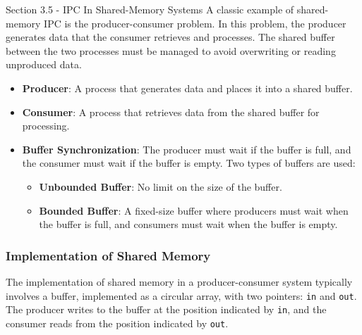 \begin{notes}{Section 3.5 - IPC In Shared-Memory Systems}
    A classic example of shared-memory IPC is the producer-consumer problem. In this problem, the producer generates data that the consumer retrieves and processes. The shared buffer between the two 
    processes must be managed to avoid overwriting or reading unproduced data.
    
    \begin{highlight}
    
        \begin{itemize}
            \item \textbf{Producer}: A process that generates data and places it into a shared buffer.
            \item \textbf{Consumer}: A process that retrieves data from the shared buffer for processing.
            \item \textbf{Buffer Synchronization}: The producer must wait if the buffer is full, and the consumer must wait if the buffer is empty. Two types of buffers are used:
                \begin{itemize}
                    \item \textbf{Unbounded Buffer}: No limit on the size of the buffer.
                    \item \textbf{Bounded Buffer}: A fixed-size buffer where producers must wait when the buffer is full, and consumers must wait when the buffer is empty.
                \end{itemize}
        \end{itemize}
    
    \end{highlight}
    
    \subsubsection*{Implementation of Shared Memory}
    
    The implementation of shared memory in a producer-consumer system typically involves a buffer, implemented as a circular array, with two pointers: \texttt{in} and \texttt{out}. The producer writes 
    to the buffer at the position indicated by \texttt{in}, and the consumer reads from the position indicated by \texttt{out}.
    
    \begin{highlight}
    

\end{highlight}
\end{notes}
